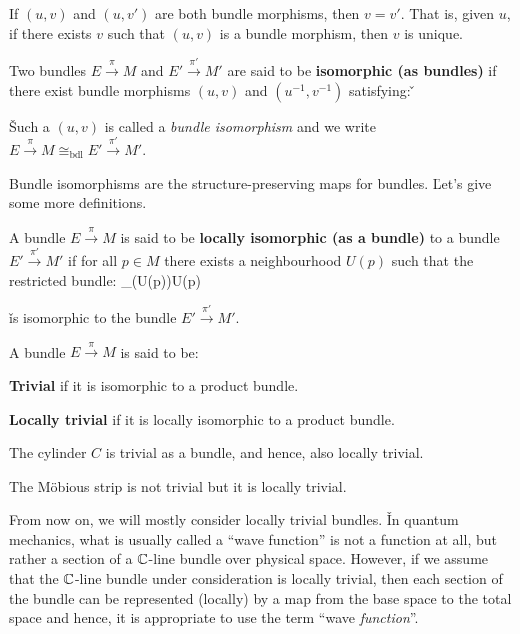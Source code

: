 If $(u,v)$ and $(u,v')$ are both bundle morphisms, then $v=v'$. That is, given $u$, if there exists $v$ such that $
(u,v)$ is a bundle morphism, then $v$ is unique.

Two bundles $E\xrightarrow{\,\pi\,}M$ and $E'\xrightarrow{\,\pi'\,}M'$ are said to be \textbf{isomorphic (as bundles)}
if there exist bundle morphisms $(u,v)$ and $(u^{-1},v^{-1})$ satisfying: \v
\bse
{}
\ese

\v

Such a $(u,v)$ is called a \emph{bundle isomorphism} and we write
$E\xrightarrow{\, \pi\,}M \cong_{\mathrm{bdl}} E'\xrightarrow{\,\pi'\,}M'$.
\ed

Bundle isomorphisms are the structure-preserving maps for bundles. \v

Let's give some more definitions.

A bundle $E\xrightarrow{\,\pi\,}M$ is said to be \textbf{locally isomorphic (as a bundle)} to a bundle
$E'\xrightarrow{\,\pi'\,}M'$ if for all $p\in M$ there exists a neighbourhood $U(p)$ such that the restricted bundle:
\bse
{}_\pi(U(p))U(p)
\ese

\v

is isomorphic to the bundle $E'\xrightarrow{\,\pi'\,}M'$.
\ed

A bundle $E\xrightarrow{\,\pi\,}M$ is said to be:
\ben
\item[i)] \textbf{Trivial} if it is isomorphic to a product bundle.
\item[ii)] \textbf{Locally trivial} if it is locally isomorphic to a product bundle.
\een
\ed

\be
The cylinder $C$ is trivial as a bundle, and hence, also locally trivial.
\ee

\be
The Möbious strip is not trivial but it is locally trivial.
\ee

From now on, we will mostly consider locally trivial bundles. \v

In quantum mechanics, what is usually called a ``wave function'' is not a function at all, but rather a section of a
$\mathbb{C}$-line bundle over physical space. However, if we assume that the $\mathbb{C}$-line bundle under consideration is locally
trivial, then each section of the bundle can be represented (locally) by a map from the base space to the total space
and hence, it is appropriate to use the term ``wave \emph{function}''.

